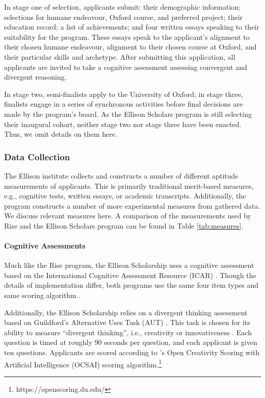 In stage one of selection, applicants submit: their demographic information; selections for humane endeavour, Oxford course, and preferred project; their education record; a list of achievements; and four written essays speaking to their suitability for the program. These essays speak to the applicant's alignment to their chosen humane endeavour, alignment to their chosen course at Oxford, and their particular skills and archetype. After submitting this application, all applicants are invited to take a cognitive assessment assessing convergent and divergent reasoning.

In stage two, semi-finalists apply to the University of Oxford; in stage three, finalists engage in a series of synchronous activities before final decisions are made by the program's board. As the Ellison Scholars program is still selecting their inaugural cohort, neither stage two nor stage three have been enacted. Thus, we omit details on them here. 

\subsubsection{Data Collection}
The Ellison institute collects and constructs a number of different aptitude measurements of applicants. This is primarily traditional merit-based measures, e.g., cognitive tests, written essays, or academic transcripts. Additionally, the program constructs a number of more experimental measures from gathered data. We discuss relevant measures here. A comparison of the measurements used by Rise and the Ellison Scholars program can be found in Table \ref{tab:measures}.

\paragraph{Cognitive Assessments} 
Much like the Rise program, the Ellison Scholarship uses a cognitive assessment based on the International Cognitive Assessment Resource (ICAR) \cite{condon2014international,subotic2020psychometric}. Though the details of implementation differ, both programs use the same four item types and same scoring algorithm \cite{burkner2021bayesian}.

Additionally, the Ellison Scholarship relies on a divergent thinking assessment based on Guildford's Alternative Uses Task (AUT) \cite{guilford1967creativity}. This task is chosen for its ability to measure ``divergent thinking'', i.e., creativity or innovativeness \cite{dumas_measuring_2020,organisciak_beyond_2023}. Each question is timed at roughly 90 seconds per question, and each applicant is given ten questions. Applicants are scored according to \textcite{organisciak_beyond_2023}'s Open Creativity Scoring with Artificial Intelligence (OCSAI) scoring algorithm.\footnote{https://openscoring.du.edu/}

